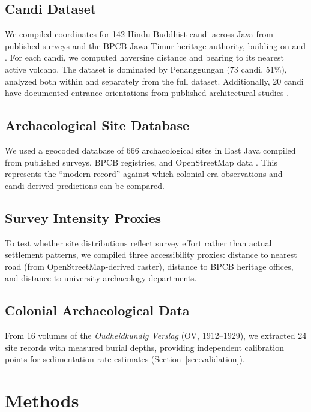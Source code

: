 \documentclass[12pt,a4paper]{article}
\begin{document}
\subsection{Candi Dataset}

We compiled coordinates for 142 Hindu-Buddhist candi across Java from published surveys and the BPCB Jawa Timur heritage authority, building on \citet{dumarcay1993} and \citet{soekmono1995}. For each candi, we computed haversine distance and bearing to its nearest active volcano. The dataset is dominated by Penanggungan (73 candi, 51\%), analyzed both within and separately from the full dataset. Additionally, 20 candi have documented entrance orientations from published architectural studies \citep{dumarcay1993}.

\subsection{Archaeological Site Database}

We used a geocoded database of 666 archaeological sites in East Java compiled from published surveys, BPCB registries, and OpenStreetMap data \citep{amien2026p1}. This represents the ``modern record'' against which colonial-era observations and candi-derived predictions can be compared.

\subsection{Survey Intensity Proxies}

To test whether site distributions reflect survey effort rather than actual settlement patterns, we compiled three accessibility proxies: distance to nearest road (from OpenStreetMap-derived raster), distance to BPCB heritage offices, and distance to university archaeology departments.

\subsection{Colonial Archaeological Data}

From 16 volumes of the \emph{Oudheidkundig Verslag} (OV, 1912--1929), we extracted 24 site records with measured burial depths, providing independent calibration points for sedimentation rate estimates (Section~\ref{sec:validation}).

\section{Methods}
\end{document}

